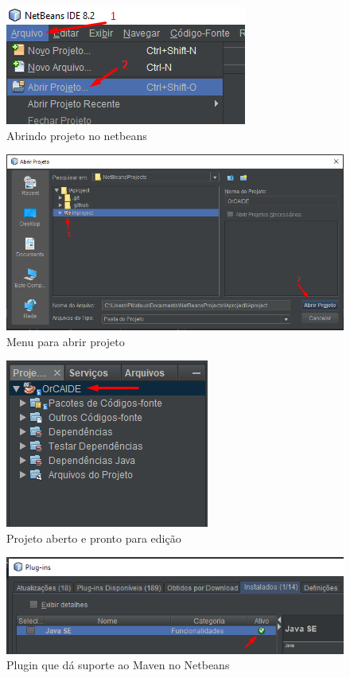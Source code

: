 \documentclass{bcc}
\begin{document}
\begin{figure}[H]
\centering
\includegraphics[width=.7\textwidth]{Figuras/install2.png}
\caption{Abrindo projeto no netbeans} 
\label{fig:install2}
\end{figure}

\begin{figure}[H]
\centering
\includegraphics[width=.9\textwidth]{Figuras/install3.png}
\caption{Menu para abrir projeto} 
\label{fig:install3}
\end{figure}

\begin{figure}[H]
\centering
\includegraphics[width=.5\textwidth]{Figuras/install4.png}
\caption{Projeto aberto e pronto para edição} 
\label{fig:install4}
\end{figure}

\begin{figure}[H]
\centering
\includegraphics[width=.9\textwidth]{Figuras/install5.png}
\caption{Plugin que dá suporte ao Maven no Netbeans} 
\label{fig:install5}
\end{figure}
\end{document}
